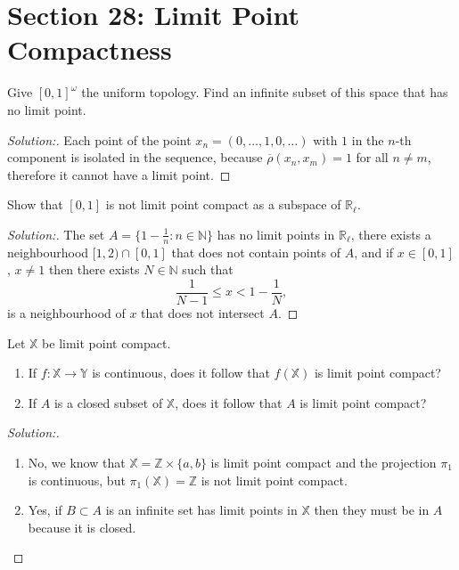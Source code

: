 \documentclass[a4paper,12pt, reqno]{article}
\theoremstyle{definition}
\newenvironment{exerr}[1]{
  \renewcommand\theexeralt{#1}
  \exeralt
}{\endexeralt}
\newenvironment{solution}{\begin{proof}[Solution:]}{\end{proof}}
\newcommand{\R}{\mathbb{R}}
\newcommand{\Z}{\mathbb{Z}}
\newcommand{\N}{\mathbb{N}}
\newcommand{\X}{\mathbb{X}}
\newcommand{\Y}{\mathbb{Y}}
\begin{document}
\section*{Section 28: Limit Point Compactness}

\begin{exerr}{1}
  Give $[0,1]^\omega$ the uniform topology. Find an infinite subset of this space that has no limit point.
\end{exerr}
\begin{solution}
  Each point of the point $x_{n} = (0,\dots,1,0,\dots)$ with $1$ in the $n$-th component is isolated in the sequence, because $\overline{\rho}(x_{n},x_{m}) = 1$ for all $n\neq m$, therefore it cannot have a limit point.
\end{solution}

\begin{exerr}{2}
  Show that $[0,1]$ is not limit point compact as a subspace of $\R_{\ell}$.
\end{exerr}
\begin{solution}
  The set $A = \{ 1-\frac{1}{n} : n\in\N \}$ has no limit points in $\R_{\ell}$, there exists a neighbourhood $[1,2)\cap [0,1]$ that does not contain points of $A$, and if $x\in[0,1]$, $x\neq1$ then there exists $N\in\N$ such that
  \begin{equation*}
      \frac{1}{N-1}\leq x < 1 - \frac{1}{N},
  \end{equation*}
  is a neighbourhood of $x$ that does not intersect $A$.
\end{solution}

\begin{exerr}{3}
  Let $\X$ be limit point compact.
  \begin{enumerate}[label=(\alph*)]
    \item If $f:\X\to\Y$ is continuous, does it follow that $f(\X)$ is limit point compact?
    \item If $A$ is a closed subset of $\X$, does it follow that $A$ is limit point compact?
  \end{enumerate}
\end{exerr}
\begin{solution}\hfill
  \begin{enumerate}[label=(\alph*)]
    \item No, we know that $\X = \Z\times\{ a,b \} $ is limit point compact and the projection $\pi_{1}$ is continuous, but $\pi_{1}(\X) = \Z$ is not limit point compact.
    \item Yes, if $B\subset A$ is an infinite set has limit points in $\X$ then they must be in $A$ because it is closed.
  \end{enumerate}
\end{solution}
\end{document}

